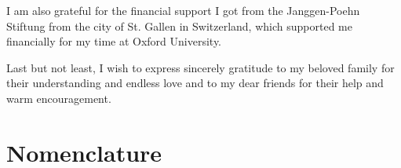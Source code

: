 I am also  grateful for the financial support I got from the Janggen-Poehn Stiftung from the city of St. Gallen in Switzerland, which supported me financially for my time at Oxford University. 

Last but not least, I wish to express sincerely gratitude to my beloved family for their understanding and endless love and to my dear friends for their help and warm encouragement. 

 \cleardoublepage
 

 \setcounter{tocdepth}{2}
 \tableofcontents

 \cleardoublepage


 \setcounter{tocdepth}{2}
 \listoffigures

 \cleardoublepage
 

 \setcounter{tocdepth}{2}
 \listoftables

 \cleardoublepage
 

\chapter*{Nomenclature}\label{chap:Nomenclature}

